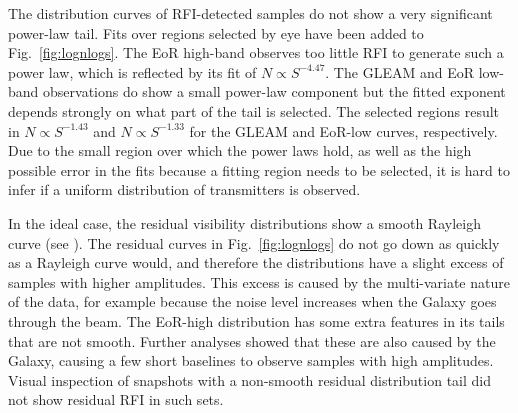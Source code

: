 \documentclass{pasa}
\begin{document}
The distribution curves of RFI-detected samples do not show a very significant power-law tail. Fits over regions selected by eye have been added to Fig.~\ref{fig:lognlogs}. The EoR high-band observes too little RFI to generate such a power law, which is reflected by its fit of $N\propto S^{-4.47}$. The GLEAM and EoR low-band observations do show a small power-law component but the fitted exponent depends strongly on what part of the tail is selected. The selected regions result in $N\propto S^{-1.43}$ and $N\propto S^{-1.33}$ for the GLEAM and EoR-low curves, respectively. Due to the small region over which the power laws hold, as well as the high possible error in the fits because a fitting region needs to be selected, it is hard to infer if a uniform distribution of transmitters is observed.

In the ideal case, the residual visibility distributions show a smooth Rayleigh curve (see \citealt{offringa-rfi-distributions}). The residual curves in Fig.~\ref{fig:lognlogs} do not go down as quickly as a Rayleigh curve would, and therefore the distributions have a slight excess of samples with higher amplitudes. This excess is caused by the multi-variate nature of the data, for example because the noise level increases when the Galaxy goes through the beam. The EoR-high distribution has some extra features in its tails that are not smooth. Further analyses showed that these are also caused by the Galaxy, causing a few short baselines to observe samples with high amplitudes. Visual inspection of snapshots with a non-smooth residual distribution tail did not show residual RFI in such sets.
\end{document}
